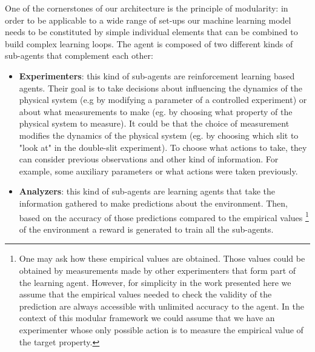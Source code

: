 \documentclass[11pt,a4paper,twoside]{report}
\newcommand{\+}{\textnormal{+} }
\theoremstyle{definition}
\numberwithin{equation}{chapter}
\begin{document}
One of the cornerstones of our architecture is the principle of modularity: in
order to be applicable to a wide range of set-ups our machine learning model
needs to be constituted by simple individual elements that can be combined to
build complex learning loops. The agent is composed of two different kinds of
sub-agents that complement each other:

\begin{itemize}
  \item \textbf{Experimenters}: this kind of sub-agents are reinforcement
  learning based agents. Their goal is to take decisions about influencing the
  dynamics of the physical system (e.g by modifying a parameter of a controlled
  experiment) or about what measurements to make (eg. by choosing what property
  of the physical system to measure). It could be that the choice of measurement
  modifies the dynamics of the physical system (eg. by choosing which slit to
  "look at" in the double-slit experiment). To choose what actions to take, they
  can consider previous observations and other kind of information. For example,
  some auxiliary parameters or what actions were taken previously.
  \item \textbf{Analyzers}: this kind of sub-agents are learning agents that
  take the information gathered to make predictions about the environment. Then,
  based on the accuracy of those predictions compared to the empirical values
  \footnote{One may ask how these empirical values are obtained. Those values
  could be obtained by measurements made by other experimenters that form part
  of the learning agent. However, for simplicity in the work presented here we
  assume that the empirical values needed to check the validity of the
  prediction are always accessible with unlimited accuracy to the agent. In the
  context of this modular framework we could assume that we have an experimenter
  whose only possible action is to measure the empirical value of the target
  property.} of the environment a reward is generated to train all the
  sub-agents. 

\end{itemize}
\end{document}
